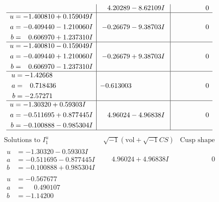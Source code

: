 \documentclass[1p]{elsarticle_modified}
\theoremstyle{definition}
\newcommand{\I}{\sqrt{-1}}
\begin{document}
$$\begin{array}{c|c|c}
 & \phantom{-}4.20289 - 8.62109 I & \phantom{-0.000000 } 0 \\ \hline\begin{aligned}
u &= -1.400810 + 0.159049 I \\
a &= -0.409440 - 1.210060 I \\
b &= \phantom{-}0.606970 + 1.237310 I\end{aligned}
 & -0.26679 - 9.38703 I & \phantom{-0.000000 } 0 \\ \hline\begin{aligned}
u &= -1.400810 - 0.159049 I \\
a &= -0.409440 + 1.210060 I \\
b &= \phantom{-}0.606970 - 1.237310 I\end{aligned}
 & -0.26679 + 9.38703 I & \phantom{-0.000000 } 0 \\ \hline\begin{aligned}
u &= -1.42668\phantom{ +0.000000I} \\
a &= \phantom{-}0.718436\phantom{ +0.000000I} \\
b &= -2.57271\phantom{ +0.000000I}\end{aligned}
 & -0.613003\phantom{ +0.000000I} & \phantom{-0.000000 } 0 \\ \hline\begin{aligned}
u &= -1.30320 + 0.59303 I \\
a &= -0.511695 + 0.877445 I \\
b &= -0.100888 - 0.985304 I\end{aligned}
 & \phantom{-}4.96024 - 4.96838 I & \phantom{-0.000000 } 0\\
 \hline 
 \end{array}$$\newpage$$\begin{array}{c|c|c}  
\text{Solutions to }I^u_{1}& \I (\text{vol} + \sqrt{-1}CS) & \text{Cusp shape}\\
 \hline 
\begin{aligned}
u &= -1.30320 - 0.59303 I \\
a &= -0.511695 - 0.877445 I \\
b &= -0.100888 + 0.985304 I\end{aligned}
 & \phantom{-}4.96024 + 4.96838 I & \phantom{-0.000000 } 0 \\ \hline\begin{aligned}
u &= -0.567677\phantom{ +0.000000I} \\
a &= \phantom{-}0.490107\phantom{ +0.000000I} \\
b &= -1.14200\phantom{ +0.000000I}\end{aligned}

\end{array}$$
\end{document}
